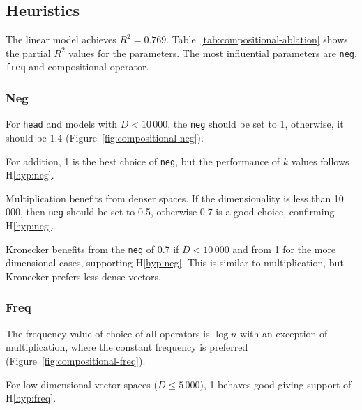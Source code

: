 \subsection{Heuristics}
\label{sec:heuristics-compositional}



The linear model achieves  $R^2 = 0.769$. Table~\ref{tab:compositional-ablation} shows the partial $R^2$ values for the parameters. The most influential parameters are \texttt{neg}, \texttt{freq} and compositional operator.

\subsubsection{Neg}
\label{sec:neg-compositional}



For \texttt{head} and models with $D < 10\,000$, the \texttt{neg} should be set to 1, otherwise, it should be 1.4 (Figure~\ref{fig:compositional-neg}).

For addition, 1 is the best choice of \texttt{neg}, but the performance of $k$ values follows H\ref{hyp:neg}.

Multiplication benefits from denser spaces. If the dimensionality is less than 10\,000, then \texttt{neg} should be set to 0.5, otherwise 0.7 is a good choice, confirming H\ref{hyp:neg}.

Kronecker benefits from the \texttt{neg} of 0.7 if $D < 10\,000$ and from 1 for the more dimensional cases, supporting H\ref{hyp:neg}. This is similar to multiplication, but Kronecker prefers less dense vectors.

\subsubsection{Freq}
\label{sec:freq-compositional}

The frequency value of choice of all operators is $\log n$ with an exception of multiplication, where the constant frequency is preferred (Figure~\ref{fig:compositional-freq}).
%
%

For low-dimensional vector spaces ($D \leq 5\,000$), 1 behaves good giving support of H\ref{hyp:freq}.
%
%

